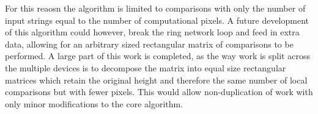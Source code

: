 \documentclass[conference]{IEEEtran}
\begin{document}
For this reaosn the algorithm is limited to comparisons with only the number of input strings equal to the number of computational pixels. A future development of this algorithm could however, break the ring network loop and feed in extra data, allowing for an arbitrary sized rectangular matrix of comparisons to be performed. A large part of this work is completed, as the way work is split across the multiple devices is to decompose the matrix into equal size rectangular matrices which retain the original height and therefore the same number of local comparisons but with fewer pixels. This would allow non-duplication of work with only minor modifications to the core algorithm.

%


%
\end{document}
